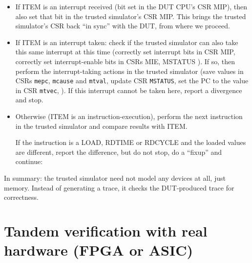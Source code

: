 \begin{itemize}

 \item If ITEM is an interrupt received (bit set in the DUT CPU's CSR
       MIP), then also set that bit in the trusted simulator's CSR
       MIP.  This brings the trusted simulator's CSR back ``in sync''
       with the DUT, from where we proceed.

 \item If ITEM is an interrupt taken: check if the trusted simulator
       can also take this same interrupt at this time (correctly set
       interrupt bits in CSR MIP, correctly set interrupt-enable bits
       in CSRs MIE, MSTATUS {\etc}).  If so, then perform the
       interrupt-taking actions in the trusted simulator (save values
       in CSRs \verb|mepc|, \verb|mcause| and \verb|mtval|, update CSR
       \verb|MSTATUS|, set the PC to the value in CSR \verb|mtvec|,
       {\etc}).  If this interrupt cannot be taken here, report a
       divergence and stop.

 \item Otherwise (ITEM is an instruction-execution), perform the next
       instruction in the trusted simulator and compare results with
       ITEM.

       If the instruction is a LOAD, RDTIME or RDCYCLE and the loaded
       values are different, report the difference, but do not stop,
       do a ``fixup'' and continue:


\end{itemize}

In summary: the trusted simulator need not model any devices at all,
just memory.  Instead of generating a trace, it checks the
DUT-produced trace for correctness.


\section{Tandem verification with real hardware (FPGA or ASIC)}

